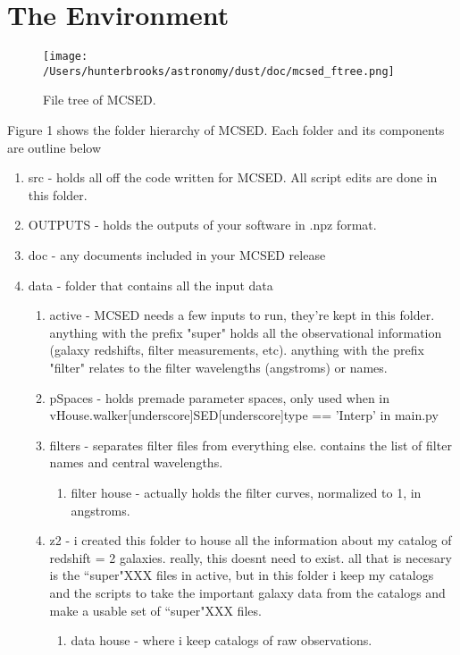 \documentclass[12pt,a4paper]{article}
\begin{document}
\section{The Environment}

\begin{figure}
\begin{centering}
	\texttt{[image: /Users/hunterbrooks/astronomy/dust/doc/mcsed\_ftree.png]}
	\caption{File tree of MCSED.}
	\end{centering}
\end{figure}

Figure 1 shows the folder hierarchy of MCSED.  Each folder and its components are outline below



\begin{enumerate}
\item src - holds all off the code written for MCSED.  All script edits are done in this folder.
\item OUTPUTS - holds the outputs of your software in .npz format.
\item doc - any documents included in your MCSED release
\item data - folder that contains all the input data 
\begin{enumerate}
\item active - MCSED needs a few inputs to run, they're kept in this folder.  anything with the prefix "super" holds all the observational information (galaxy redshifts, filter measurements, etc). anything with the prefix "filter" relates to the filter wavelengths (angstroms) or names.  
\item pSpaces - holds premade parameter spaces, only used when in vHouse.walker[underscore]SED[underscore]type == 'Interp' in main.py
\item filters - separates filter files from everything else. contains the list of filter names and central wavelengths.
\begin{enumerate}
\item filter house - actually holds the filter curves, normalized to 1, in angstroms.
\end{enumerate}
\item z2 - i created this folder to house all the information about my catalog of redshift = 2 galaxies.  really, this doesnt need to exist.  all that is necesary is the ``super"XXX files in active, but in this folder i keep my catalogs and the scripts to take the important galaxy data from the catalogs and make a usable set of ``super"XXX files.
\begin{enumerate}
\item data house - where i keep catalogs of raw observations.
\end{enumerate}
\end{enumerate}
\end{enumerate}
\end{document}

